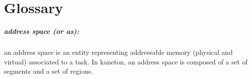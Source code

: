 
%
%

\chapter{Glossary}

\newpage

\paragraph{address space  (or as):} an  address space is an  entity
representing addressable memory (physical and virtual) associated to a
task.  In kaneton,  an address space is composed of  a set of segments
and a set of regions.



